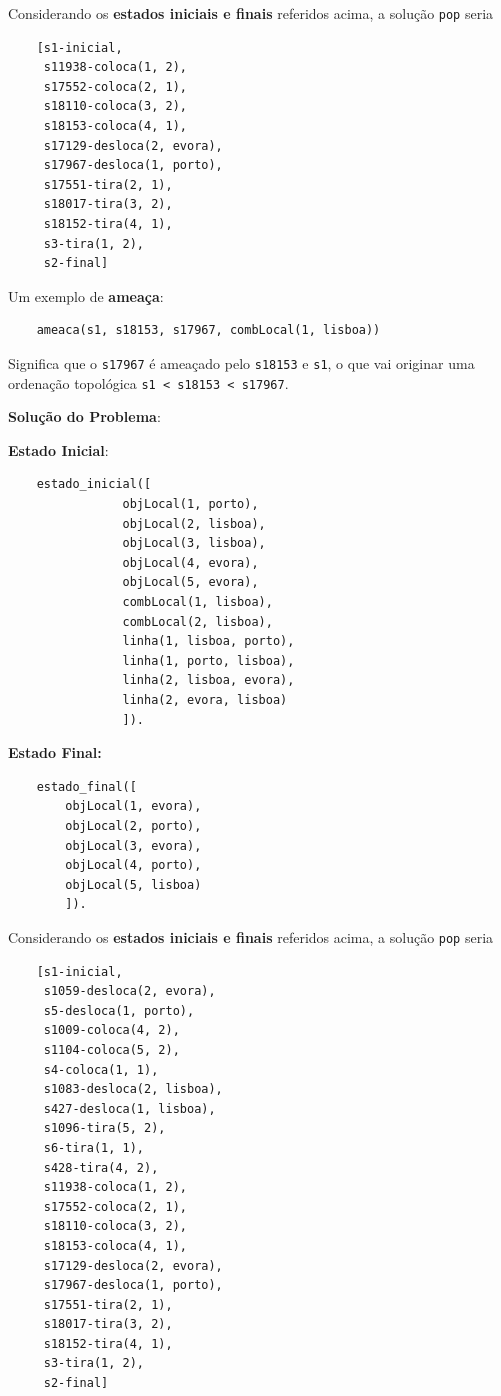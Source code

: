 \documentclass[11pt]{article}
\begin{document}
Considerando os \textbf{estados iniciais e finais} referidos acima, a solução \verb|pop| seria

\begin{lstlisting}
    [s1-inicial,
     s11938-coloca(1, 2),
     s17552-coloca(2, 1),
     s18110-coloca(3, 2),
     s18153-coloca(4, 1),
     s17129-desloca(2, evora),
     s17967-desloca(1, porto),
     s17551-tira(2, 1),
     s18017-tira(3, 2),
     s18152-tira(4, 1),
     s3-tira(1, 2),
     s2-final]
\end{lstlisting}

Um exemplo de \textbf{ameaça}:

\begin{lstlisting}
    ameaca(s1, s18153, s17967, combLocal(1, lisboa))
\end{lstlisting}

Significa que o \verb|s17967| é ameaçado pelo \verb|s18153| e \verb|s1|, o que vai originar uma
ordenação topológica \verb|s1 < s18153 < s17967|.

\newpage
\textbf{Solução do Problema}:

\hspace{1,2cm}\textbf{Estado Inicial}:

\begin{lstlisting}
    estado_inicial([
                objLocal(1, porto),
                objLocal(2, lisboa),
                objLocal(3, lisboa),
                objLocal(4, evora),
                objLocal(5, evora),
                combLocal(1, lisboa),
                combLocal(2, lisboa),
                linha(1, lisboa, porto),
                linha(1, porto, lisboa),
                linha(2, lisboa, evora),
                linha(2, evora, lisboa)
                ]).
\end{lstlisting}

\hspace{1,2cm}\textbf{Estado Final:}

\begin{lstlisting}
    estado_final([
        objLocal(1, evora),
        objLocal(2, porto),
        objLocal(3, evora),
        objLocal(4, porto),
        objLocal(5, lisboa)
        ]).
\end{lstlisting}

Considerando os \textbf{estados iniciais e finais} referidos acima, a solução \verb|pop| seria

\begin{lstlisting}
    [s1-inicial,
     s1059-desloca(2, evora),
     s5-desloca(1, porto),
     s1009-coloca(4, 2),
     s1104-coloca(5, 2),
     s4-coloca(1, 1),
     s1083-desloca(2, lisboa),
     s427-desloca(1, lisboa),
     s1096-tira(5, 2),
     s6-tira(1, 1),
     s428-tira(4, 2),
     s11938-coloca(1, 2),
     s17552-coloca(2, 1),
     s18110-coloca(3, 2),
     s18153-coloca(4, 1),
     s17129-desloca(2, evora),
     s17967-desloca(1, porto),
     s17551-tira(2, 1),
     s18017-tira(3, 2),
     s18152-tira(4, 1),
     s3-tira(1, 2),
     s2-final]
\end{lstlisting}
\end{document}
